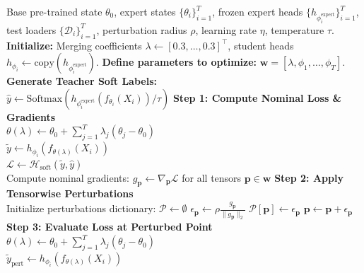 \documentclass{article}
\begin{document}
\begin{algorithm}[ht]
\caption{Sharpness-Aware Test-Time Adaptive Merging (SATT-Merge)}
\label{alg:satt}
\begin{algorithmic}[1]
\REQUIRE Base pre-trained state $\theta_0$, expert states $\{\theta_i\}_{i=1}^T$, frozen expert heads $\{h_{\phi_i^{\text{expert}}}\}_{i=1}^T$, test loaders $\{\mathcal{D}_i\}_{i=1}^T$, perturbation radius $\rho$, learning rate $\eta$, temperature $\tau$.
\STATE \textbf{Initialize:} Merging coefficients $\lambda \leftarrow [0.3, \dots, 0.3]^\top$, student heads $h_{\phi_i} \leftarrow \text{copy}(h_{\phi_i^{\text{expert}}})$.
\STATE \textbf{Define parameters to optimize:} $\mathbf{w} = [\lambda, \phi_1, \dots, \phi_T]$.
        \STATE \textbf{Generate Teacher Soft Labels:} \\
        $\hat{y} \leftarrow \text{Softmax}\left( h_{\phi_i^{\text{expert}}}(f_{\theta_i}(X_i)) / \tau \right)$
        \STATE \textbf{Step 1: Compute Nominal Loss \& Gradients} \\
        $\theta(\lambda) \leftarrow \theta_0 + \sum_{j=1}^T \lambda_j (\theta_j - \theta_0)$ \\
        $\tilde{y} \leftarrow h_{\phi_i}\left(f_{\theta(\lambda)}(X_i)\right)$ \\
        $\mathcal{L} \leftarrow \mathcal{H}_{\text{soft}}(\tilde{y}, \hat{y})$ \\
        Compute nominal gradients: $g_{\mathbf{p}} \leftarrow \nabla_{\mathbf{p}} \mathcal{L}$ for all tensors $\mathbf{p} \in \mathbf{w}$
        \STATE \textbf{Step 2: Apply Tensorwise Perturbations} \\
        Initialize perturbations dictionary: $\mathcal{P} \leftarrow \emptyset$
                \STATE $\epsilon_{\mathbf{p}} \leftarrow \rho \frac{g_{\mathbf{p}}}{\|g_{\mathbf{p}}\|_2}$
                \STATE $\mathcal{P}[\mathbf{p}] \leftarrow \epsilon_{\mathbf{p}}$
                \STATE $\mathbf{p} \leftarrow \mathbf{p} + \epsilon_{\mathbf{p}}$
            \ENDIF
        \ENDFOR
        \STATE \textbf{Step 3: Evaluate Loss at Perturbed Point} \\
        $\theta(\lambda) \leftarrow \theta_0 + \sum_{j=1}^T \lambda_j (\theta_j - \theta_0)$ \\
        $\tilde{y}_{\text{pert}} \leftarrow h_{\phi_i}\left(f_{\theta(\lambda)}(X_i)\right)$ \\

\end{algorithmic}
\end{algorithm}
\end{document}
